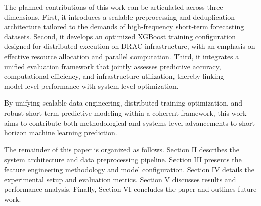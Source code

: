\documentclass[conference]{IEEEtran}
\begin{document}
The planned contributions of this work can be articulated across three dimensions. First, it introduces a scalable preprocessing and deduplication architecture tailored to the demands of high‑frequency short‑term forecasting datasets. Second, it develops an optimized XGBoost training configuration designed for distributed execution on DRAC infrastructure, with an emphasis on effective resource allocation and parallel computation. Third, it integrates a unified evaluation framework that jointly assesses predictive accuracy, computational efficiency, and infrastructure utilization, thereby linking model‑level performance with system‑level optimization.

By unifying scalable data engineering, distributed training optimization, and robust short-term predictive modeling within a coherent framework, this work aims to contribute both methodological and systems-level advancements to short-horizon machine learning prediction.

The remainder of this paper is organized as follows. Section II describes the system architecture and data preprocessing pipeline. Section III presents the feature engineering methodology and model configuration. Section IV details the experimental setup and evaluation metrics. Section V discusses results and performance analysis. Finally, Section VI concludes the paper and outlines future work.




\end{document}

